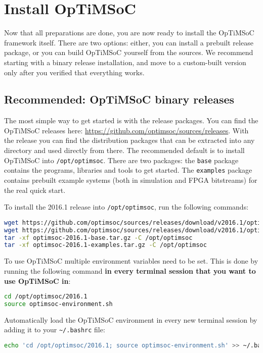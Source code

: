 \section{Install OpTiMSoC}
Now that all preparations are done, you are now ready to install the OpTiMSoC framework itself.
There are two options: either, you can install a prebuilt release package, or you can build OpTiMSoC yourself from the sources.
We recommend starting with a binary release installation, and move to a custom-built version only after you verified that everything works.

\subsection{Recommended: OpTiMSoC binary releases}
The most simple way to get started is with the release packages. You
can find the OpTiMSoC releases here:
\url{https://github.com/optimsoc/sources/releases}. With the release
you can find the distribution packages that can be extracted into any
directory and used directly from there. The recommended default is to
install OpTiMSoC into \verb|/opt/optimsoc|. There are two packages:
the \verb|base| package contains the programs, libraries and tools
to get started. The \verb|examples| package contains prebuilt example systems (both in simulation and FPGA bitstreams) for the real quick start.

To install the 2016.1 release into \verb|/opt/optimsoc|, run the following commands:

\begin{lstlisting}[language=sh]
wget https://github.com/optimsoc/sources/releases/download/v2016.1/optimsoc-2016.1-base.tar.gz
wget https://github.com/optimsoc/sources/releases/download/v2016.1/optimsoc-2016.1-examples.tar.gz
tar -xf optimsoc-2016.1-base.tar.gz -C /opt/optimsoc
tar -xf optimsoc-2016.1-examples.tar.gz -C /opt/optimsoc
\end{lstlisting}

To use OpTiMSoC multiple environment variables need to be set.
This is done by running the following command \textbf{in every terminal session that you want to use OpTiMSoC in}:

\begin{lstlisting}[language=sh]
cd /opt/optimsoc/2016.1
source optimsoc-environment.sh
\end{lstlisting}

\begin{docnote}
Automatically load the OpTiMSoC environment in every new terminal session by adding it to your \verb|~/.bashrc| file:

\begin{lstlisting}[language=sh]
echo 'cd /opt/optimsoc/2016.1; source optimsoc-environment.sh' >> ~/.bashrc
\end{lstlisting}
\end{docnote}

